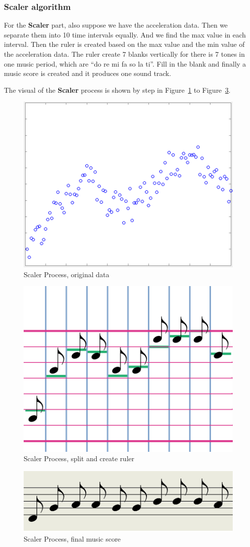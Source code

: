 \subsubsection{Scaler algorithm}

For the \textbf{Scaler} part, also suppose we have the acceleration data. Then
we separate them into 10 time intervals equally. And we find the max value in
each interval. Then the ruler is created based on the max value and the min
value of the acceleration data. The ruler create 7 blanks vertically for there
is 7 tones in one music period, which are ``do re mi fa so la ti''. Fill in the
blank and finally a music score is created and it produces one sound track. 

The visual of the \textbf{Scaler} process is shown by step in
Figure~\ref{scalerStep0} to Figure~\ref{scalerStep2}. 

\begin{figure}[H]
\centering
\includegraphics[width=0.35\linewidth]{figWR/scaler0}
\caption{Scaler Process, original data}
\label{scalerStep0}
\end{figure}


\begin{figure}[H]
\centering
\includegraphics[width=0.35\linewidth]{figWR/scaler1}
\caption{Scaler Process, split and create ruler}
\label{scalerStep1}
\end{figure}


\begin{figure}[H]
\centering
\newcommand{\widthOfScalerStepFigure}{5cm}
\includegraphics[width=0.35\linewidth]{figWR/scaler2}
\caption{Scaler Process, final music score}
\label{scalerStep2}
\end{figure}


